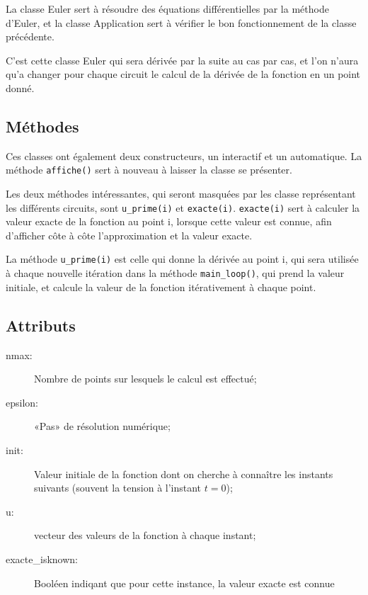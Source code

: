 \documentclass{report}
\begin{document}
        La classe Euler sert à résoudre des équations différentielles par la méthode d’Euler, et la classe
        Application sert à vérifier le bon fonctionnement de la classe précédente.

        C’est cette classe Euler qui sera dérivée par la suite au cas par cas, et l’on n’aura qu’a changer
        pour chaque circuit le calcul de la dérivée de la fonction en un point donné.

        \subsection{Méthodes}

        Ces classes ont également deux constructeurs, un interactif et un automatique. La méthode \verb|affiche()|
        sert à nouveau à laisser la classe se présenter.

        Les deux méthodes intéressantes, qui seront masquées par les classe représentant les différents circuits,
        sont \verb|u_prime(i)| et \verb|exacte(i)|. \verb|exacte(i)| sert à calculer la valeur exacte de la fonction
        au point i, lorsque cette valeur est connue, afin d’afficher côte à côte l’approximation et la valeur exacte.

        La méthode \verb|u_prime(i)| est celle qui donne la dérivée au point i, qui sera utilisée à chaque nouvelle 
        itération dans la méthode \verb|main_loop()|, qui prend la valeur initiale, et calcule la valeur de la fonction
        itérativement à chaque point.

        \subsection{Attributs}

        \begin{description}
            \item[nmax:] Nombre de points sur lesquels le calcul est effectué;
            \item[epsilon:] «Pas» de résolution numérique;
            \item[init:] Valeur initiale de la fonction dont on cherche à connaître les instants suivants
                (souvent la tension à l’instant $t=0$);
            \item[u:] vecteur des valeurs de la fonction à chaque instant;
            \item[exacte\_isknown:] Booléen indiqant que pour cette instance, la valeur exacte est connue
        \end{description}
\end{document}
